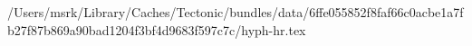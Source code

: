 /Users/msrk/Library/Caches/Tectonic/bundles/data/6ffe055852f8faf66c0acbe1a7fb27f87b869a90bad1204f3bf4d9683f597c7c/hyph-hr.tex